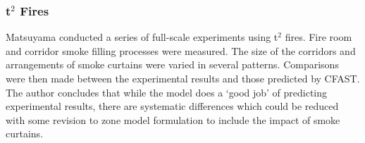 \subsubsection{t$^2$ Fires}

Matsuyama conducted a series of full-scale experiments \cite{Matsuyama:2000} using t$^2$ fires. Fire room and corridor smoke filling processes were measured. The size of the corridors and arrangements of smoke curtains were varied in several patterns. Comparisons were then made between the experimental results and those predicted by CFAST. The author concludes that while the model does a `good job' of predicting experimental results, there are systematic differences which could be reduced with some revision to zone model formulation to include the impact of smoke curtains.

